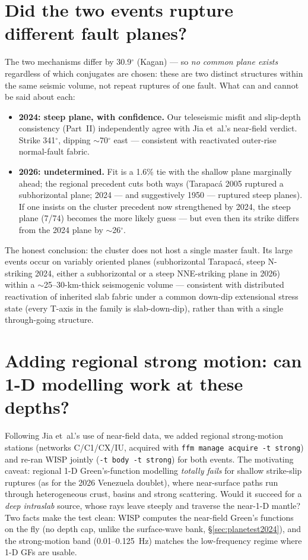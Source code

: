 \documentclass[11pt]{article}
\begin{document}
\section{Did the two events rupture different fault planes?}
The two mechanisms differ by 30.9$^\circ$ (Kagan) --- so \emph{no common plane exists}
regardless of which conjugates are chosen: these are two distinct structures within the same
seismic volume, not repeat ruptures of one fault. What can and cannot be said about each:
\begin{itemize}
\item \textbf{2024: steep plane, with confidence.} Our teleseismic misfit and slip-depth
  consistency (Part~II) independently agree with Jia et~al.'s near-field verdict. Strike
  341$^\circ$, dipping $\sim$70$^\circ$ east --- consistent with reactivated outer-rise
  normal-fault fabric.
\item \textbf{2026: undetermined.} Fit is a 1.6\% tie with the shallow plane marginally ahead;
  the regional precedent cuts both ways (Tarapac\'a 2005 ruptured a subhorizontal plane;
  2024 --- and suggestively 1950 --- ruptured steep planes). If one insists on the cluster
  precedent now strengthened by 2024, the steep plane (7/74) becomes the more likely guess ---
  but even then its strike differs from the 2024 plane by $\sim$26$^\circ$.
\end{itemize}
The honest conclusion: the cluster does not host a single master fault. Its large events
occur on variably oriented planes (subhorizontal Tarapac\'a, steep N-striking 2024, either a
subhorizontal or a steep NNE-striking plane in 2026) within a $\sim$25--30-km-thick
seismogenic volume --- consistent with distributed reactivation of inherited slab fabric
under a common down-dip extensional stress state (every T-axis in the family is
slab-down-dip), rather than with a single through-going structure.

\section{Adding regional strong motion: can 1-D modelling work at these depths?}
\label{sec:regional}
Following Jia et~al.'s use of near-field data, we added regional strong-motion stations
(networks C/C1/CX/IU, acquired with \texttt{ffm manage acquire -t strong}) and re-ran WISP
jointly (\texttt{-t body -t strong}) for both events. The motivating caveat: regional 1-D
Green's-function modelling \emph{totally fails} for shallow strike-slip ruptures (as for the
2026 Venezuela doublet), where near-surface paths run through heterogeneous crust, basins and
strong scattering. Would it succeed for a \emph{deep intraslab} source, whose rays leave
steeply and traverse the near-1-D mantle? Two facts make the test clean: WISP computes the
near-field Green's functions on the fly (no depth cap, unlike the surface-wave bank,
\S\ref{sec:planetest2024}), and the strong-motion band (0.01--0.125~Hz) matches the low-frequency
regime where 1-D GFs are usable.
\end{document}
